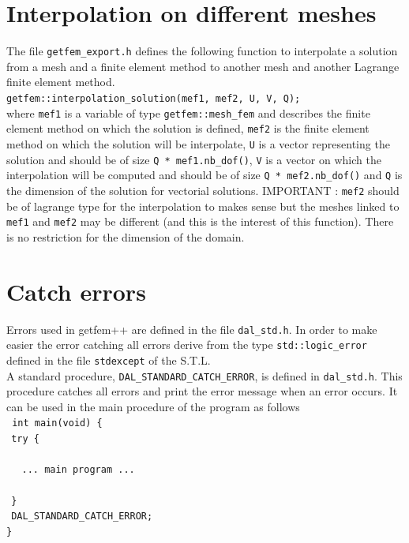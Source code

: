 \documentclass[11pt,a4paper]{article}
\begin{document}
\section{Interpolation on different meshes}

The file {\tt getfem\_export.h} defines the following function to interpolate a solution from a mesh and a finite element method  to another mesh and another Lagrange finite element method.\\[0.5cm]
{\tt getfem::interpolation\_solution(mef1, mef2, U, V, Q); }\\[0.5cm]
where {\tt mef1}  is a variable of type {\tt getfem::mesh\_fem} and describes the finite element method on which the solution is defined, {\tt mef2} is the finite element method on which the solution will be interpolate,  {\tt U} is a vector representing the solution and should be of size {\tt Q * mef1.nb\_dof()}, {\tt V} is a vector on which the interpolation will be computed and should be of size {\tt Q * mef2.nb\_dof()} and {\tt Q} is the dimension of the solution for vectorial solutions. IMPORTANT : {\tt mef2} should be of lagrange type for the interpolation to makes sense but the meshes linked to {\tt mef1} and {\tt mef2} may be different (and this is the interest of this function). There is no restriction for the dimension of the domain. 
 
\section{Catch errors}

Errors used in getfem++ are defined in the file {\tt dal\_std.h}. In order to make easier  the error catching all errors derive from the type {\tt std::logic\_error} defined in the file {\tt  stdexcept} of the S.T.L.\\[0.5cm]
A standard procedure, {\tt DAL\_STANDARD\_CATCH\_ERROR}, is defined in {\tt dal\_std.h}. This procedure catches all errors and print the error message when an error occurs. It can be used in the main procedure of the program as follows\\[0.5cm]
{\tt
  int main(void) \{ \\
  $\mbox{}\ \ $try \{ \\
  \\
  $\mbox{}\ \ \ \ $ ... main program ... \\
  \\
  $\mbox{}\ \ $\} \\
  $\mbox{}\ \ $DAL\_STANDARD\_CATCH\_ERROR; \\
  \}
}
\end{document}
